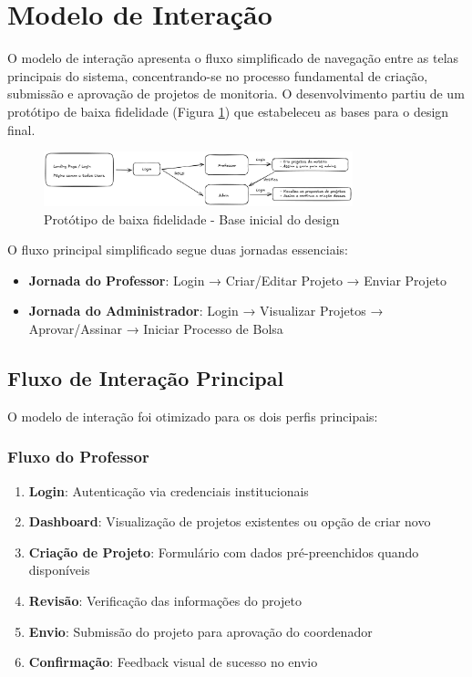 \documentclass[12pt, a4paper]{report}
\begin{document}
\section{Modelo de Interação}

O modelo de interação apresenta o fluxo simplificado de navegação entre as telas principais do sistema, concentrando-se no processo fundamental de criação, submissão e aprovação de projetos de monitoria. O desenvolvimento partiu de um protótipo de baixa fidelidade (Figura \ref{fig:excalidraw}) que estabeleceu as bases para o design final.

\begin{figure}[H]
\centering
\includegraphics[width=0.8\textwidth]{figma/excalidraw-design.png}
\caption{Protótipo de baixa fidelidade - Base inicial do design}
\label{fig:excalidraw}
\end{figure}

O fluxo principal simplificado segue duas jornadas essenciais:
\begin{itemize}
    \item \textbf{Jornada do Professor}: Login → Criar/Editar Projeto → Enviar Projeto
    \item \textbf{Jornada do Administrador}: Login → Visualizar Projetos → Aprovar/Assinar → Iniciar Processo de Bolsa
\end{itemize}

\subsection{Fluxo de Interação Principal}

O modelo de interação foi otimizado para os dois perfis principais:

\subsubsection{Fluxo do Professor}
\begin{enumerate}
    \item \textbf{Login}: Autenticação via credenciais institucionais
    \item \textbf{Dashboard}: Visualização de projetos existentes ou opção de criar novo
    \item \textbf{Criação de Projeto}: Formulário com dados pré-preenchidos quando disponíveis
    \item \textbf{Revisão}: Verificação das informações do projeto
    \item \textbf{Envio}: Submissão do projeto para aprovação do coordenador
    \item \textbf{Confirmação}: Feedback visual de sucesso no envio
\end{enumerate}
\end{document}
